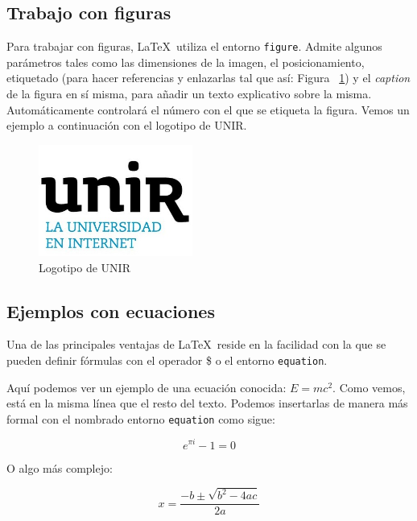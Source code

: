 \documentclass[review]{elsarticle}
\begin{document}


\subsection{Trabajo con figuras}

Para trabajar con figuras, \LaTeX\ utiliza el entorno \texttt{figure}. Admite algunos parámetros tales como las dimensiones de la imagen, el posicionamiento, etiquetado (para hacer referencias y enlazarlas tal que así: Figura ~\ref{fig:unir}) y el \textit{caption} de la figura en sí misma, para añadir un texto explicativo sobre la misma. Automáticamente controlará el número con el que se etiqueta la figura. Vemos un ejemplo a continuación con el logotipo de UNIR. 

\begin{figure}[!h]
  \begin{center}
    \includegraphics[width=0.45\textwidth]{figures/unir.jpg} 
    \caption{Logotipo de UNIR}
    \label{fig:unir}
  \end{center}
\end{figure}

\subsection{Ejemplos con ecuaciones}

Una de las principales ventajas de \LaTeX\ reside en la facilidad con la que se pueden definir fórmulas con el operador \$ o el entorno \texttt{equation}.

Aquí podemos ver un ejemplo de una ecuación conocida:  $E=mc^2$. Como vemos, está en la misma línea que el resto del texto. Podemos insertarlas de manera más formal con el nombrado entorno \texttt{equation} como sigue:

\begin{equation} \label{eq:Euler} 
  e^{\pi i} - 1 = 0
\end{equation}

O algo más complejo:

\begin{equation} \label{eq:secondgrade} 
  x = \frac{-b \pm{\sqrt{b^2 -4ac}}}{2a}
\end{equation}
\end{document}
